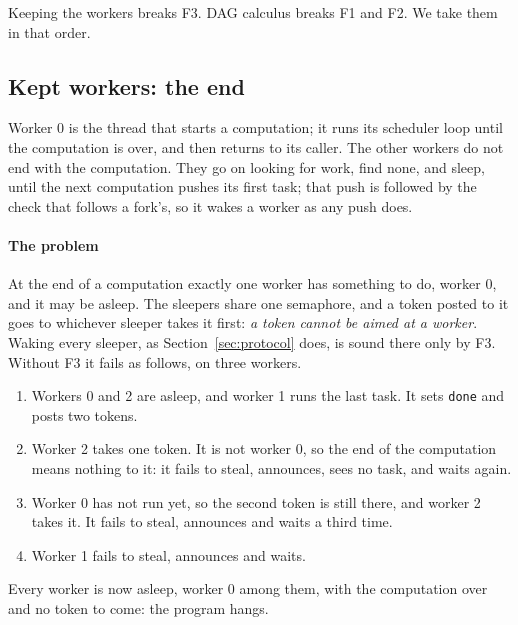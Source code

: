 \documentclass[sigplan,nonacm]{acmart}
\begin{document}
Keeping the workers breaks F3.
%
DAG calculus breaks F1 and F2.
%
We take them in that order.

\subsection{Kept workers: the end}

Worker 0 is the thread that starts a computation; it runs its
scheduler loop until the computation is over, and then returns to its
caller.
%
The other workers do not end with the computation.
%
They go on looking for work, find none, and sleep, until the next
computation pushes its first task; that push is followed by the check
that follows a fork's, so it wakes a worker as any push does.

\paragraph{The problem}
%
At the end of a computation exactly one worker has something to do,
worker 0, and it may be asleep.
%
The sleepers share one semaphore, and a token posted to it goes to
whichever sleeper takes it first: \emph{a token cannot be aimed at a
worker}.
%
Waking every sleeper, as Section~\ref{sec:protocol} does, is sound
there only by F3.
%
Without F3 it fails as follows, on three workers.

\begin{enumerate}[leftmargin=*]
\item Workers 0 and 2 are asleep, and worker 1 runs the last task.
  It sets \lstinline|done| and posts two tokens.
\item Worker 2 takes one token.
  It is not worker 0, so the end of the computation means nothing to
  it: it fails to steal, announces, sees no task, and waits again.
\item Worker 0 has not run yet, so the second token is still there,
  and worker 2 takes it.
  It fails to steal, announces and waits a third time.
\item Worker 1 fails to steal, announces and waits.
\end{enumerate}

Every worker is now asleep, worker 0 among them, with the computation
over and no token to come: the program hangs.
\end{document}
